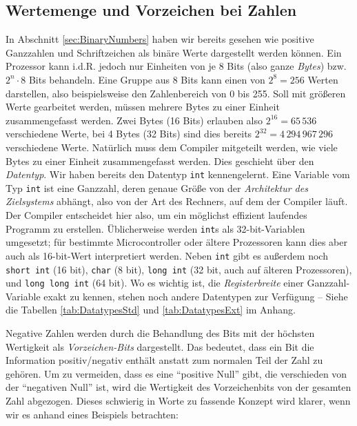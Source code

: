 \subsection{Wertemenge und Vorzeichen bei Zahlen}\label{sec:DataRepresentation}
\label{sec:Datawidth}
In Abschnitt \ref{sec:BinaryNumbers} haben wir bereits gesehen wie positive Ganzzahlen und Schriftzeichen als binäre Werte dargestellt werden können. Ein Prozessor kann i.d.R. jedoch nur Einheiten von je 8 Bits (also ganze \emph{Bytes}) bzw. $2^n\cdot8$ Bits behandeln. Eine Gruppe aus 8 Bits kann einen von $2^8 = 256$ Werten darstellen, also beispielsweise den Zahlenbereich von 0 bis 255. Soll mit größeren Werte gearbeitet werden, müssen mehrere Bytes zu einer Einheit zusammengefasst werden. Zwei Bytes (16 Bits) erlauben also $2^{16} = 65\,536$ verschiedene Werte, bei 4 Bytes (32 Bits) sind dies bereits $2^{32} = 4\,294\,967\,296$ verschiedene Werte. Natürlich muss dem Compiler mitgeteilt werden, wie viele Bytes zu einer Einheit zusammengefasst werden. Dies geschieht über den \emph{Datentyp}. Wir haben bereits den Datentyp \texttt{int} kennengelernt. Eine Variable vom Typ \texttt{int} ist eine Ganzzahl, deren genaue Größe von der \emph{Architektur des Zielsystems} abhängt, also von der Art des Rechners, auf dem der Compiler läuft. Der Compiler entscheidet hier also, um ein möglichst effizient laufendes Programm zu erstellen. Üblicherweise werden \texttt{int}s als 32-bit-Variablen umgesetzt; für bestimmte Microcontroller oder ältere Prozessoren kann dies aber auch als 16-bit-Wert interpretiert werden. Neben \texttt{int} gibt es außerdem noch \texttt{short int} (16 bit), \texttt{char} (8 bit), \texttt{long int} (32 bit, auch auf älteren Prozessoren), und \texttt{long long int} (64 bit). Wo es wichtig ist, die \emph{Registerbreite} einer Ganzzahl-Variable exakt zu kennen, stehen noch andere Datentypen zur Verfügung -- Siehe die Tabellen \ref{tab:DatatypesStd} und \ref{tab:DatatypesExt} im Anhang.

Negative Zahlen werden durch die Behandlung des Bits mit der höchsten Wertigkeit als \emph{Vorzeichen-Bits} dargestellt. Das bedeutet, dass ein Bit die Information positiv/negativ enthält anstatt zum normalen Teil der Zahl zu gehören. Um zu vermeiden, dass es eine \enquote{positive Null} gibt, die verschieden von der \enquote{negativen Null} ist, wird die Wertigkeit des Vorzeichenbits von der gesamten Zahl abgezogen. Dieses schwierig in Worte zu fassende Konzept wird klarer, wenn wir es anhand eines Beispiels betrachten:

